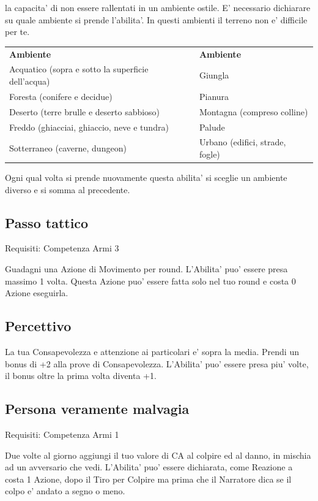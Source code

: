 \documentclass[a4paper,11pt,twoside,openany]{book}
\begin{document}
	la capacita' di non essere rallentati in un ambiente ostile. E' necessario dichiarare su quale ambiente si prende l'abilita'. In questi ambienti il terreno non e' difficile per te.
	
	\bigskip
	
	\begin{tabular}{ll}
		\toprule
		\textbf{Ambiente} & \textbf{Ambiente}\tabularnewline
		Acquatico (sopra e sotto la superficie dell'acqua) & Giungla\tabularnewline
		Foresta (conifere e decidue) & Pianura\tabularnewline
		Deserto (terre brulle e deserto sabbioso) & Montagna (compreso colline)\tabularnewline
		Freddo (ghiacciai, ghiaccio, neve e tundra) & Palude\tabularnewline
		Sotterraneo (caverne, dungeon) & Urbano (edifici, strade, fogle)\tabularnewline
		
	\end{tabular}
	
	\bigskip
	
	Ogni qual volta si prende nuovamente questa abilita' si sceglie un
	ambiente diverso e si somma al precedente.
	
	\subsection{Passo tattico}
	
	Requisiti: Competenza Armi 3
	
	Guadagni una Azione di Movimento per round. L'Abilita' puo' essere presa massimo 1 volta. Questa Azione puo' essere fatta solo nel tuo round e costa 0 Azione eseguirla.
	
	\subsection{Percettivo}
	
	La tua Consapevolezza e attenzione ai particolari e' sopra la media.
	Prendi un bonus di +2 alla prove di Consapevolezza. L'Abilita' puo'
	essere presa piu' volte, il bonus oltre la prima volta diventa +1.
	
	\subsection{Persona veramente malvagia}
	
	Requisiti: Competenza Armi 1
	
	Due volte al giorno aggiungi il tuo valore di CA al colpire ed al danno, in mischia ad un avversario che vedi. L'Abilita' puo' essere dichiarata, come Reazione a costa 1 Azione, dopo il Tiro per Colpire ma prima che il Narratore dica se il colpo e' andato a segno o meno.
	
\end{document}

